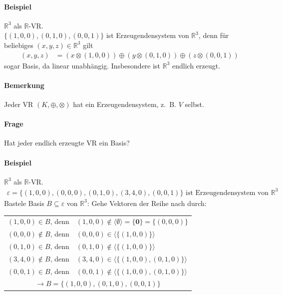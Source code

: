 \documentclass[a5paper, 10pt]{book}
\newcommand{\inR}{\in\mathbb{R}}
\newcommand{\circleplus}{\oplus}%
\newcommand{\circlecdot}{\otimes}%
\newcommand{\boldzero}{\mathbf{0}}
\begin{document}
				\paragraph{Beispiel}
					$\mathbb{R}^3$ als $\mathbb{R}$-VR.\\
					$\{(1,0,0),(0,1,0),(0,0,1)\}$ ist Erzeugendensystem von $\mathbb{R}^3$, denn für beliebiges $(x,y,z)\inR^3$ gilt
					\begin{align}
						(x,y,z) &= (x \circlecdot (1,0,0)) \circleplus (y\circlecdot(0,1,0)) \circleplus (z\circlecdot(0,0,1))
					\end{align}
					sogar Basis, da linear unabhängig. Insbesondere ist $\mathbb{R}^3$ endlich erzeugt.
					
				\paragraph{Bemerkung}
					Jeder VR $(K,\circleplus,\circlecdot)$ hat ein Erzeugendensystem, z.~B. $V$ selbst.
				\paragraph{Frage}
					Hat jeder endlich erzeugte VR ein Basis?
				\paragraph{Beispiel}
					$\mathbb{R}^3$ als $\mathbb{R}$-VR.
					\begin{align}
						\varepsilon = \{ (1,0,0), (0,0,0), (0,1,0), (3,4,0), (0,0,1) \} \text{ ist Erzeugendensystem von } \mathbb{R}^3
					\end{align}
					Bastele Basis $B \subseteq \varepsilon$ von $\mathbb{R}^3$: Gehe Vektoren der Reihe nach durch:
					\begin{longtable}{rl}
						$(1,0,0) \in B$, denn	& $(1,0,0) \notin \langle \emptyset \rangle = \{\boldzero\} = \{(0,0,0)\}$\\
						$(0,0,0) \notin B$, denn& $(0,0,0) \in \langle \{ (1,0,0) \} \rangle$ \\
						$(0,1,0) \in B$, denn	& $(0,1,0) \notin \langle \{ (1,0,0) \} \rangle$ \\
						$(3,4,0) \notin B$, denn& $(3,4,0) \in \langle \{ (1,0,0), (0,1,0) \} \rangle$ \\
						$(0,0,1) \in B$, denn	& $(0,0,1) \notin \langle \{ (1,0,0), (0,1,0) \} \rangle$ \\
						\multicolumn{2}{c}{$\rightarrow B = \{ (1,0,0), (0,1,0), (0,0,1) \}$}
					\end{longtable}
				
\end{document}
